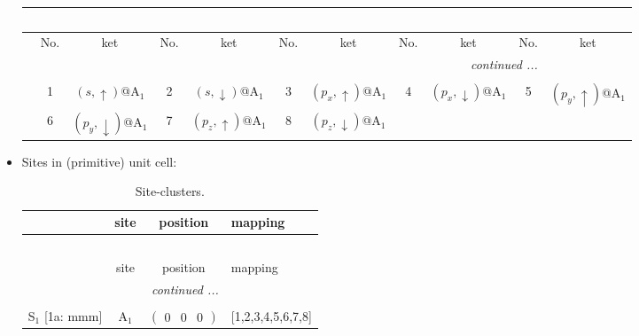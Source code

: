 \documentclass[fleqn,10pt,landscape]{article}
\begin{document}
\begin{itemize}
\begin{center}
\begin{longtable}{c|cc|cc|cc|cc|cc}
\multicolumn{10}{l}{\tablename\ \thetable{}} \\
 \hline \hline
 & No. & ket & No. & ket & No. & ket & No. & ket & No. & ket \\ \hline \endhead

 \hline \hline
\multicolumn{10}{r}{\footnotesize\it continued ...} \\ \endfoot

 \hline \hline
\multicolumn{10}{r}{} \\ \endlastfoot

 & 1 & $(s,\uparrow)$@A$_{1}$ & 2 & $(s,\downarrow)$@A$_{1}$ & 3 & $(p_{x},\uparrow)$@A$_{1}$ & 4 & $(p_{x},\downarrow)$@A$_{1}$ & 5 & $(p_{y},\uparrow)$@A$_{1}$ \\
& 6 & $(p_{y},\downarrow)$@A$_{1}$ & 7 & $(p_{z},\uparrow)$@A$_{1}$ & 8 & $(p_{z},\downarrow)$@A$_{1}$ &  &  &  &  \\
\end{longtable}
\end{center}

\item Sites in (primitive) unit cell:
\begin{center}
\renewcommand{\arraystretch}{1.3}
\begin{longtable}{cc|c|l}
\caption{Site-clusters.}
 \\
 \hline \hline
 & site & position & mapping \\ \hline \endfirsthead

\multicolumn{3}{l}{\tablename\ \thetable{}} \\
 \hline \hline
 & site & position & mapping \\ \hline \endhead

 \hline \hline
\multicolumn{3}{r}{\footnotesize\it continued ...} \\ \endfoot

 \hline \hline
\multicolumn{3}{r}{} \\ \endlastfoot

S$_{1}$ [1a: mmm] & A$_1$ & $\begin{pmatrix} 0 & 0 & 0 \end{pmatrix}$ & [1,2,3,4,5,6,7,8] \\
\end{longtable}
\end{center}


\end{itemize}
\end{document}
